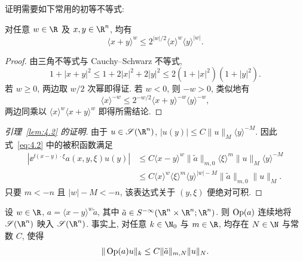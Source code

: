 证明需要如下常用的初等不等式:

\begin{lemma}\label{lem:4.3}
对任意 $w \in \R$ 及 $x, y \in \R^n$, 均有
\[
    \langle x + y \rangle^w \le 2^{|w|/2} \langle x \rangle^w \langle y \rangle^{|w|}.
\]
\end{lemma}

\begin{proof}
由三角不等式与 Cauchy--Schwarz 不等式,
\begin{equation}\label{eq:4.8}
    1 + |x + y|^2 \le 1 + 2|x|^2 + 2|y|^2 \le 2(1 + |x|^2)(1 + |y|^2).
\end{equation}
若 $w \ge 0$, 两边取 $w/2$ 次幂即得证. 若 $w < 0$, 则 $-w > 0$, 类似地有
\begin{equation}\label{eq:4.9}
    \langle x \rangle^{-w} \le 2^{-w/2} \langle x + y \rangle^{-w} \langle y \rangle^{-w},
\end{equation}
两边同乘以 $\langle x \rangle^w \langle x + y \rangle^w$ 即得所需结论.
\end{proof}

\begin{proof}[引理~\ref{lem:4.2} 的证明]
由于 $u \in \Schwartz(\R^n)$, $|u(y)| \le C \|u\|_M \langle y \rangle^{-M}$. 因此式~\eqref{eq:4.2} 中的被积函数满足
\begin{equation}\label{eq:4.10}
    \begin{aligned}
        |\ee^{\ii (x-y) \cdot \xi} a(x, y, \xi) u(y)| &\le C \langle x - y \rangle^w \|\tilde{a}\|_{m, 0} \langle \xi \rangle^m \|u\|_M \langle y \rangle^{-M} \\
        &\le C \langle x \rangle^w \langle \xi \rangle^m \langle y \rangle^{|w| - M} \|\tilde{a}\|_{m, 0} \|u\|_M.
    \end{aligned}
\end{equation}
只要 $m < -n$ 且 $|w| - M < -n$, 该表达式关于 $(y, \xi)$ 便绝对可积.
\end{proof}

\begin{proposition}[残余符号量化的界]\label{prop:4.4}
设 $w \in \R$, $a = \langle x - y \rangle^w \tilde{a}$, 其中 $\tilde{a} \in S^{-\infty}(\R^n \times \R^n; \R^n)$. 则 $\operatorname{Op}(a)$ 连续地将 $\Schwartz(\R^n)$ 映入 $\Schwartz(\R^n)$. 事实上, 对任意 $k \in \N_0$ 与 $m \in \R$, 均存在 $N \in \N$ 与常数 $C$, 使得
\begin{equation}\label{eq:4.11}
    \|\operatorname{Op}(a) u\|_k \le C \|\tilde{a}\|_{m, N} \|u\|_N.
\end{equation}
\end{proposition}

